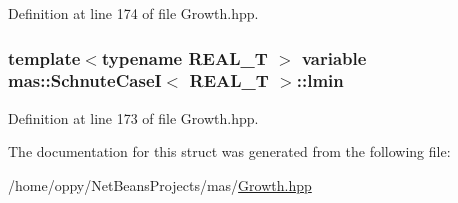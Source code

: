 Definition at line 174 of file Growth.\-hpp.

\hypertarget{structmas_1_1_schnute_case_i_a36282ecc11a1baa5c47a31d9419853a0}{
\subsubsection[{lmin}]{\setlength{\rightskip}{0pt plus 5cm}template$<$typename R\-E\-A\-L\-\_\-\-T $>$ {\bf variable} {\bf mas\-::\-Schnute\-Case\-I}$<$ R\-E\-A\-L\-\_\-\-T $>$\-::lmin}}\label{structmas_1_1_schnute_case_i_a36282ecc11a1baa5c47a31d9419853a0}


Definition at line 173 of file Growth.\-hpp.



The documentation for this struct was generated from the following file\-:\begin{DoxyCompactItemize}
\item 
/home/oppy/\-Net\-Beans\-Projects/mas/\hyperlink{_growth_8hpp}{Growth.\-hpp}\end{DoxyCompactItemize}
